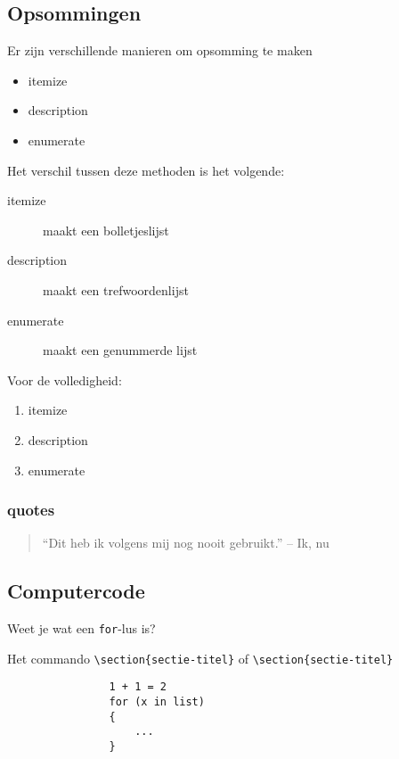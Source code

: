 \documentclass{article} %
\begin{document}
		\subsection{Opsommingen}
			Er zijn verschillende manieren om opsomming te maken
			\begin{itemize}
				\item itemize
				\item description
				\item enumerate
			\end{itemize}
			Het verschil tussen deze methoden is het volgende:
			\begin{description}
				\item[itemize] maakt een bolletjeslijst
				\item[description] maakt een trefwoordenlijst
				\item[enumerate] maakt een genummerde lijst
			\end{description}
			Voor de volledigheid:
			\begin{enumerate}
				\item itemize
				\item description
				\item enumerate
			\end{enumerate}
			
		\subsubsection{quotes}
			\begin{quote}
				“Dit heb ik volgens mij nog nooit gebruikt.” -- Ik, nu
			\end{quote}
			
		\subsection{Computercode}
			Weet je wat een \texttt{for}-lus is?
			
			Het commando \verb|\section{sectie-titel}| of \verb~\section{sectie-titel}~
			
			\begin{verbatim}
				1 + 1 = 2
				for (x in list)
				{
					... 
				}
			\end{verbatim}
			
\end{document}
